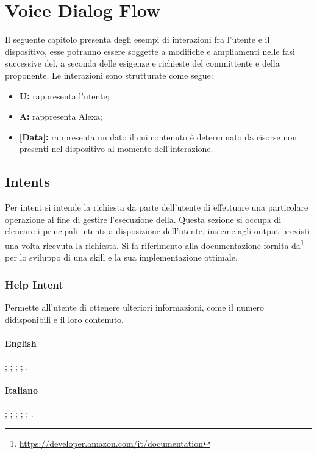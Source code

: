 \chapter{Voice Dialog Flow}
\label{VDF}
Il seguente capitolo presenta degli esempi di interazioni fra l'utente e il dispositivo, esse potranno essere soggette a modifiche e ampliamenti nelle fasi successive del, a seconda delle esigenze e richieste del committente e della proponente.
Le interazioni sono strutturate come segue:
\begin{itemize}
	\item \textbf{U:} rappresenta l'utente;
	\item \textbf{A:} rappresenta Alexa;
	\item \textbf{[Data]:} rappresenta un dato il cui contenuto è determinato da risorse non presenti nel dispositivo al momento dell'interazione.
\end{itemize}


\section{Intents}
Per intent si intende la richiesta da parte dell'utente di effettuare una particolare operazione al fine di gestire l'esecuzione della. 
Questa sezione si occupa di elencare i principali intents a disposizione dell'utente, insieme agli output previsti una volta ricevuta la richiesta.
Si fa riferimento alla documentazione fornita da\footnote{\url{https://developer.amazon.com/it/documentation}} per lo sviluppo di una skill e la sua implementazione ottimale.

\subsection{Help Intent}\label{help}
Permette all'utente di ottenere ulteriori informazioni, come il numero didisponibili e il loro contenuto.
\subsubsection{English}
\begin{itemize}
	;
	;
	;
	;
	.	
\end{itemize}
\subsubsection{Italiano}
\begin{itemize}
	;
	;
	;
	;
	;
	.
\end{itemize}

